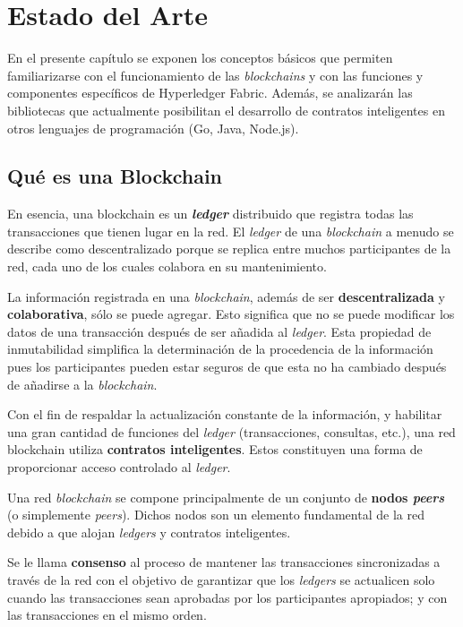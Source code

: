 \chapter{Estado del Arte}\label{chapter:state-of-the-art}

En el presente capítulo se exponen los conceptos básicos que permiten familiarizarse con el funcionamiento de las \textit{blockchains} y con las funciones y componentes específicos de Hyperledger Fabric. Además, se analizarán las bibliotecas que  actualmente posibilitan el desarrollo de contratos inteligentes en otros lenguajes de programación (Go, Java, Node.js).

\section{Qué es una Blockchain}
En esencia, una blockchain es un \textbf{\textit{ledger}} distribuido que registra todas las transacciones que tienen lugar en la red. El \textit{ledger} de una \textit{blockchain} a menudo se describe como descentralizado porque se replica entre muchos participantes de la red, cada uno de los cuales colabora en su mantenimiento.

La información registrada en una \textit{blockchain}, además de ser \textbf{descentralizada} y \textbf{colaborativa}, sólo se puede agregar. Esto significa que no se puede modificar los datos de una transacción después de ser añadida al \textit{ledger}. Esta propiedad de inmutabilidad simplifica la determinación de la procedencia de la información pues los participantes pueden estar seguros de que esta no ha cambiado después de añadirse a la \textit{blockchain}.

Con el fin de respaldar la actualización constante de la información, y  habilitar una gran cantidad de funciones del \textit{ledger} (transacciones, consultas, etc.), una red  blockchain utiliza \textbf{contratos inteligentes}. Estos constituyen una forma de proporcionar acceso controlado al \textit{ledger}.

Una red  \textit{blockchain} se compone principalmente de un conjunto de \textbf{nodos \textit{peers}} (o simplemente \textit{peers}). Dichos nodos son un elemento fundamental de la red debido a que alojan \textit{ledgers} y contratos inteligentes.

Se le llama \textbf{consenso} al proceso de mantener las transacciones sincronizadas a través de la red con el objetivo de garantizar que los \textit{ledgers} se actualicen solo cuando las transacciones sean aprobadas por los participantes apropiados; y con las transacciones en el mismo orden.

